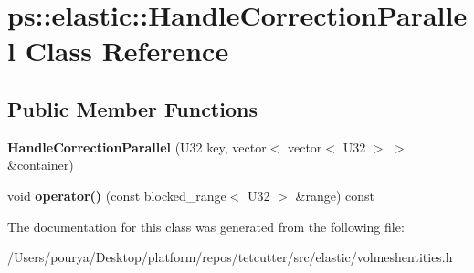 \hypertarget{classps_1_1elastic_1_1HandleCorrectionParallel}{}\section{ps\+:\+:elastic\+:\+:Handle\+Correction\+Parallel Class Reference}
\label{classps_1_1elastic_1_1HandleCorrectionParallel}
\subsection*{Public Member Functions}
\begin{DoxyCompactItemize}
\item 
\hypertarget{classps_1_1elastic_1_1HandleCorrectionParallel_ad9def55626e14e06bf41e3e233f905e1}{}{\bfseries Handle\+Correction\+Parallel} (U32 key, vector$<$ vector$<$ U32 $>$ $>$ \&container)\label{classps_1_1elastic_1_1HandleCorrectionParallel_ad9def55626e14e06bf41e3e233f905e1}

\item 
\hypertarget{classps_1_1elastic_1_1HandleCorrectionParallel_a27dc726eb77a9b6f0b85fe1d68b3e7a5}{}void {\bfseries operator()} (const blocked\+\_\+range$<$ U32 $>$ \&range) const \label{classps_1_1elastic_1_1HandleCorrectionParallel_a27dc726eb77a9b6f0b85fe1d68b3e7a5}

\end{DoxyCompactItemize}


The documentation for this class was generated from the following file\+:\begin{DoxyCompactItemize}
\item 
/\+Users/pourya/\+Desktop/platform/repos/tetcutter/src/elastic/volmeshentities.\+h\end{DoxyCompactItemize}
